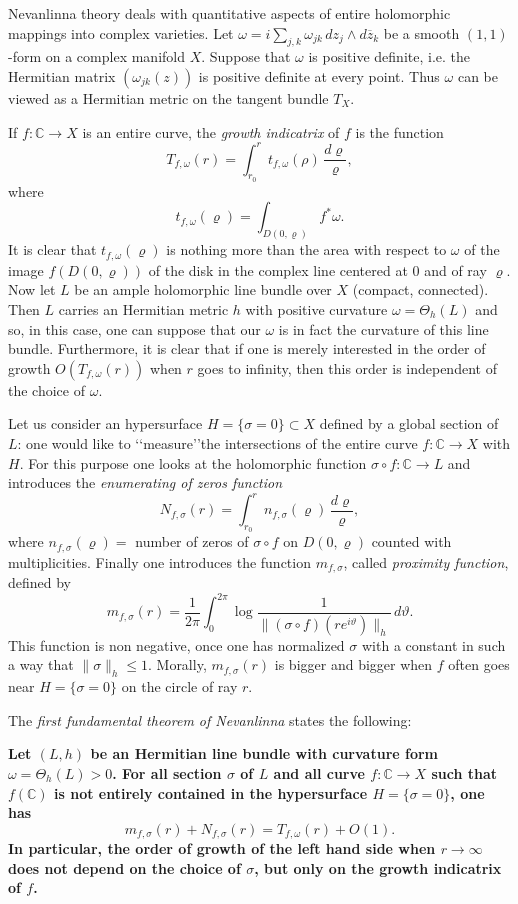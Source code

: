 \documentclass[12pt]{article}
\begin{document}
Nevanlinna theory deals with quantitative aspects of entire holomorphic mappings into complex varieties. Let $\omega=i\sum_{j,k}\omega_{jk}\,dz_j\wedge d\overline z_k$ be a smooth $(1,1)$-form on a complex manifold $X$. Suppose that $\omega$ is positive definite, i.e. the Hermitian matrix $(\omega_{jk}(z))$ is positive definite at every point. Thus $\omega$ can be viewed as a Hermitian metric on the tangent bundle $T_X$.

If $f\colon\mathbb C\to X$ is an entire curve, the \emph{growth indicatrix} of $f$ is the function
$$
T_{f,\omega}(r)=\int_{r_0}^rt_{f,\omega}(\rho)\,\frac{d\varrho}\varrho,
$$
where
$$
t_{f,\omega}(\varrho)=\int_{D(0,\varrho)}f^*\omega.
$$
It is clear that $t_{f,\omega}(\varrho)$ is nothing more than the area with respect to $\omega$ of the image $f(D(0,\varrho))$ of the disk in the complex line centered at $0$ and of ray $\varrho$.
Now let $L$ be an ample holomorphic line bundle over $X$ (compact, connected). Then $L$ carries an Hermitian metric $h$ with positive curvature $\omega=\Theta_h(L)$ and so, in this case, one can suppose that our $\omega$ is in fact the curvature of this line bundle. Furthermore, it is clear that if one is merely interested in the order of growth $O(T_{f,\omega}(r))$ when $r$ goes to infinity, then this order is independent of the choice of $\omega$.

Let us consider an hypersurface $H=\{\sigma=0\}\subset X$ defined by a global section of $L$: one would like to \lq\lq measure\rq\rq the intersections of the entire curve $f\colon\mathbb C\to X$ with $H$. For this purpose one looks at the holomorphic function $\sigma\circ f\colon\mathbb C\to L$ and introduces the \emph{enumerating of zeros function}
$$
N_{f,\sigma}(r)=\int_{r_0}^rn_{f,\sigma}(\varrho)\,\frac{d\varrho}\varrho,
$$
where $n_{f,\sigma}(\varrho)=$ number of zeros of $\sigma\circ f$ on $D(0,\varrho)$ counted with multiplicities. Finally one introduces the function $m_{f,\sigma}$, called \emph{proximity function}, defined by
$$
m_{f,\sigma}(r)=\frac 1{2\pi}\int_0^{2\pi}\log\frac 1{\|(\sigma\circ f)(re^{i\vartheta})\|_h}\,d\vartheta.
$$
This function is non negative, once one has normalized $\sigma$ with a constant in such a way that $\|\sigma\|_h\le 1$. Morally, $m_{f,\sigma}(r)$ is bigger and bigger when $f$ often goes near $H=\{\sigma=0\}$ on the circle of ray $r$. 

The \emph{first fundamental theorem of Nevanlinna} states the following:

{\bf Let $(L,h)$ be an Hermitian line bundle with curvature form $\omega=\Theta_h(L)>0$. For all section $\sigma$ of $L$ and all curve $f\colon\mathbb C\to X$ such that $f(\mathbb C)$ is not entirely contained in the hypersurface $H=\{\sigma=0\}$, one has
$$
m_{f,\sigma}(r)+N_{f,\sigma}(r)=T_{f,\omega}(r)+O(1).
$$
In particular, the order of growth of the left hand side when $r\to\infty$ does not depend on the choice of $\sigma$, but only on the growth indicatrix of $f$.}
\end{document}
